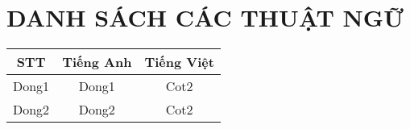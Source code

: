 

\chapter*{\centering DANH SÁCH CÁC THUẬT NGỮ}






























\begin{table}[h]

\centering

\begin{tabular}{|c|c|c|}

\hline

STT & Tiếng Anh & Tiếng Việt \\

\hline

Dong1 & Dong1 & Cot2 \\

\hline

Dong2 & Dong2 & Cot2 \\

\hline

\end{tabular}

\end{table}

